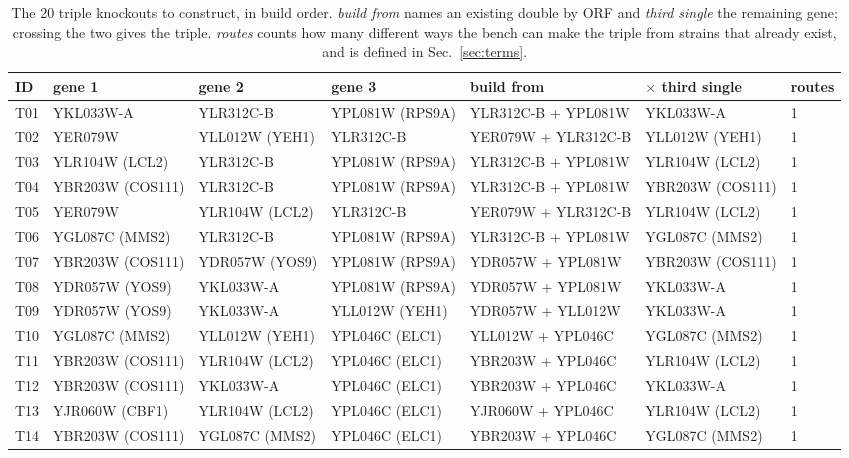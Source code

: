 \begin{table}[H]\centering
\scriptsize
\caption[]{The 20 triple knockouts to construct, in build order. \emph{build from} names an existing double by ORF and \emph{third single} the remaining gene; crossing the two gives the triple. \emph{routes} counts how many different ways the bench can make the triple from strains that already exist, and is defined in Sec.~\ref{sec:terms}.}\label{tab:new-triples}
\begin{tabular}{lllllll}
\toprule
ID & gene 1 & gene 2 & gene 3 & build from & $\times$ third single & routes \\
\midrule
T01 & YKL033W-A & YLR312C-B & YPL081W (RPS9A) & YLR312C-B + YPL081W & YKL033W-A & 1 \\
T02 & YER079W & YLL012W (YEH1) & YLR312C-B & YER079W + YLR312C-B & YLL012W (YEH1) & 1 \\
T03 & YLR104W (LCL2) & YLR312C-B & YPL081W (RPS9A) & YLR312C-B + YPL081W & YLR104W (LCL2) & 1 \\
T04 & YBR203W (COS111) & YLR312C-B & YPL081W (RPS9A) & YLR312C-B + YPL081W & YBR203W (COS111) & 1 \\
T05 & YER079W & YLR104W (LCL2) & YLR312C-B & YER079W + YLR312C-B & YLR104W (LCL2) & 1 \\
T06 & YGL087C (MMS2) & YLR312C-B & YPL081W (RPS9A) & YLR312C-B + YPL081W & YGL087C (MMS2) & 1 \\
T07 & YBR203W (COS111) & YDR057W (YOS9) & YPL081W (RPS9A) & YDR057W + YPL081W & YBR203W (COS111) & 1 \\
T08 & YDR057W (YOS9) & YKL033W-A & YPL081W (RPS9A) & YDR057W + YPL081W & YKL033W-A & 1 \\
T09 & YDR057W (YOS9) & YKL033W-A & YLL012W (YEH1) & YDR057W + YLL012W & YKL033W-A & 1 \\
T10 & YGL087C (MMS2) & YLL012W (YEH1) & YPL046C (ELC1) & YLL012W + YPL046C & YGL087C (MMS2) & 1 \\
T11 & YBR203W (COS111) & YLR104W (LCL2) & YPL046C (ELC1) & YBR203W + YPL046C & YLR104W (LCL2) & 1 \\
T12 & YBR203W (COS111) & YKL033W-A & YPL046C (ELC1) & YBR203W + YPL046C & YKL033W-A & 1 \\
T13 & YJR060W (CBF1) & YLR104W (LCL2) & YPL046C (ELC1) & YJR060W + YPL046C & YLR104W (LCL2) & 1 \\
T14 & YBR203W (COS111) & YGL087C (MMS2) & YPL046C (ELC1) & YBR203W + YPL046C & YGL087C (MMS2) & 1 \\

\end{tabular}
\end{table}
